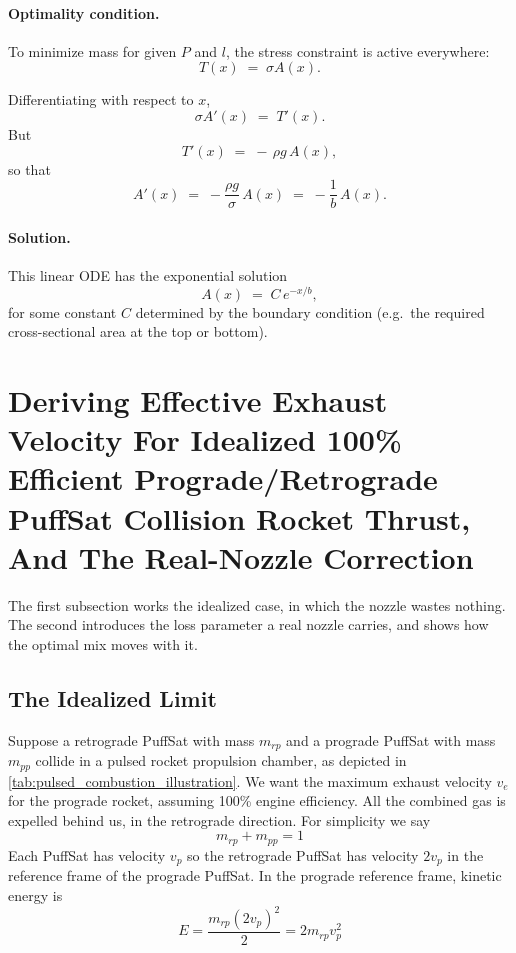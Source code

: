 \documentclass{article}
\begin{document}
\paragraph{Optimality condition.} 
To minimize mass for given $P$ and $l$, the stress constraint is active everywhere:
\[
T(x) \;=\; \sigma A(x).
\]

Differentiating with respect to $x$,
\[
\sigma A'(x) \;=\; T'(x).
\]
But
\[
T'(x) \;=\; -\,\rho g\, A(x),
\]
so that
\[
A'(x) \;=\; -\frac{\rho g}{\sigma}\, A(x) \;=\; -\frac{1}{b}\,A(x).
\]

\paragraph{Solution.} 
This linear ODE has the exponential solution
\[
A(x) \;=\; C\, e^{-x/b},
\]
for some constant $C$ determined by the boundary condition (e.g.\ the required cross-sectional area at the top or bottom).

\section{Deriving Effective Exhaust Velocity For Idealized 100\% Efficient Prograde/Retrograde PuffSat Collision Rocket Thrust, And The Real-Nozzle Correction}\label{sec:dv_effective}
The first subsection works the idealized case, in which the nozzle wastes nothing. The second introduces the loss parameter a real nozzle carries, and shows how the optimal mix moves with it.

\subsection{The Idealized Limit}
Suppose a retrograde PuffSat with mass $m_{rp}$ and a prograde PuffSat with mass $m_{pp}$ collide in a pulsed rocket propulsion chamber, as depicted in \autoref{tab:pulsed_combustion_illustration}. We want the maximum exhaust velocity $v_e$ for the prograde rocket, assuming 100\% engine efficiency. All the combined gas is expelled behind us, in the retrograde direction. For simplicity we say 
\begin{equation}
m_{rp} + m_{pp} = 1\label{eq:mass_is_1}
\end{equation} 
Each PuffSat has velocity $v_p$ so the retrograde PuffSat has velocity $2v_p$ in the reference frame of the prograde PuffSat. In the prograde reference frame, kinetic energy is
\begin{equation}
E = \frac{m_{rp} (2v_p)^2}{2} = 2m_{rp}v_p^2\label{eq:ke_PuffSats}
\end{equation}
\end{document}
